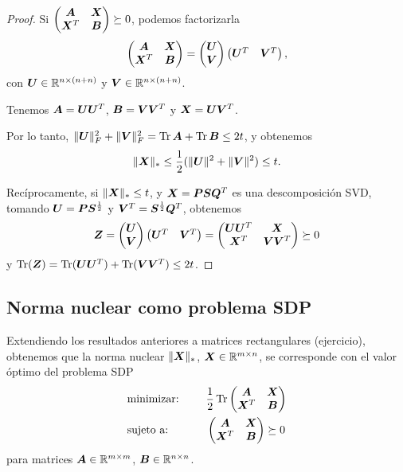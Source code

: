 \begin{proof}
Si $\begin{pmatrix} \bm{A} & \bm{X} \\ \bm{X}^T & \bm{B} \end{pmatrix} \succeq 0$, podemos factorizarla
$$
\begin{pmatrix} \bm{A} & \bm{X} \\ \bm{X}^T & \bm{B} \end{pmatrix} = \begin{pmatrix} \bm{U} \\ \bm{V} \end{pmatrix}
\begin{pmatrix} \bm{U}^T & \bm{V}^T \end{pmatrix},
$$
con $\bm{U} \in \mathbb{R}^{n \times (n+n)}$ y $\bm{V} \in \mathbb{R}^{n \times (n+n)}$.

Tenemos $\bm{A} = \bm{U} \bm{U}^T$,  $\bm{B} = \bm{V} \bm{V}^T$ y $\bm{X} = \bm{U} \bm{V}^T$.

Por lo tanto, $\|\bm{U}\|_F^2 + \|\bm{V}\|_F^2 = \operatorname{Tr} \bm{A} + \operatorname{Tr} \bm{B} \le 2t$, y obtenemos
$$\|\bm{X}\|_* \le \frac{1}{2}(\|\bm{U}\|^2 + \|\bm{V}\|^2) \le t.$$

Recíprocamente, si $\|\bm{X}\|_* \le t$,
y $\bm{X} = \bm{P} \bm{S} \bm{Q}^T$ es una descomposición SVD, tomando
$\bm{U} = \bm{P} \bm{S}^{\frac12}$ y $\bm{V}^T = \bm{S}^{\frac12} \bm{Q}^T$, obtenemos
$$
\bm{Z} = \begin{pmatrix} \bm{U} \\ \bm{V} \end{pmatrix}
\begin{pmatrix} \bm{U}^T & \bm{V}^T \end{pmatrix} = \begin{pmatrix} \bm{U}\bm{U}^T & \bm{X} \\ \bm{X}^T & \bm{V} \bm{V}^T \end{pmatrix} \succeq 0$$
y $\operatorname{Tr}(\bm{Z}) = \operatorname{Tr}(\bm{U}\bm{U}^T) + \operatorname{Tr}(\bm{V}\bm{V}^T) \le 2t$.

\end{proof}

\subsection{Norma nuclear como problema SDP}

Extendiendo los resultados anteriores a matrices rectangulares (ejercicio), obtenemos que la norma nuclear $\|\bm{X}\|_*$, $\bm{X} \in \mathbb{R}^{m \times n}$, se corresponde con el valor óptimo del problema SDP
\begin{alignat*}{2}
  & \text{minimizar: } & & \frac{1}{2}\operatorname{Tr} \begin{pmatrix} \bm{A} & \bm{X} \\ \bm{X}^T & \bm{B} \end{pmatrix} \\
   & \text{sujeto a: } & \quad & \begin{pmatrix} \bm{A} & \bm{X} \\ \bm{X}^T & \bm{B} \end{pmatrix}   \succeq 0
\end{alignat*}
para matrices $\bm{A} \in \mathbb{R}^{m \times m}$, $\bm{B} \in \mathbb{R}^{n \times n}$.

